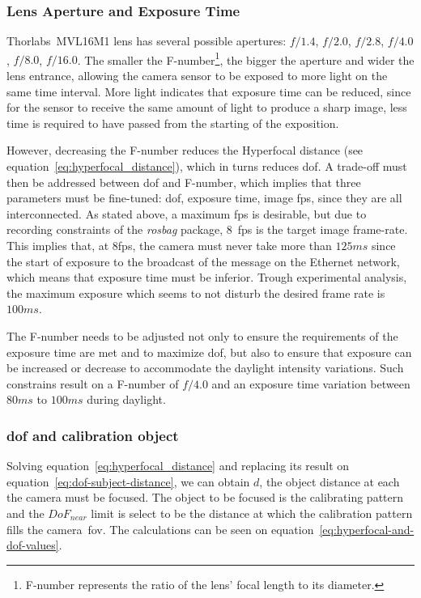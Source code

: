 \subsubsection{Lens Aperture and Exposure Time}
Thorlabs\cp~MVL16M1 lens has several possible apertures: $f/1.4$, $f/2.0$, $f/2.8$, $f/4.0$, $f/8.0$, $f/16.0$. The smaller the F-number\footnote{F-number represents the ratio of the lens' focal length to its diameter.}, the bigger the aperture and wider the lens entrance, allowing the camera sensor to be exposed to more light on the same time interval. More light indicates that exposure time can be reduced, since for the sensor to receive the same amount of light to produce a sharp image, less time is required to have passed from the starting of the exposition.

However, decreasing the F-number reduces the Hyperfocal distance (see equation~\ref{eq:hyperfocal_distance}), which in turns reduces \acf{dof}. A trade-off must then be addressed between \ac{dof} and F-number, which implies that three parameters must be fine-tuned: \ac{dof}, exposure time, image \ac{fps}, since they are all interconnected. As stated above, a maximum \ac{fps} is desirable, but due to recording constraints of the \emph{rosbag} package, $8$~\ac{fps} is the target image frame-rate. This implies that, at $8$\ac{fps}, the camera must never take more than $125ms$ since the start of exposure to the broadcast of the message on the Ethernet network, which means that exposure time must be inferior. Trough experimental analysis, the maximum exposure which seems to not disturb the desired frame rate is $100ms$. 

The F-number needs to be adjusted not only to ensure the requirements of the exposure time are met and to maximize \acl{dof}, but also to ensure that exposure can be increased or decrease to accommodate the daylight intensity variations. Such constrains result on a F-number of $f/4.0$ and an exposure time variation between $80ms$ to $100ms$ during daylight.

\subsubsection{\acl{dof} and calibration object}
\label{subsec:calibration:dof-and-calibration-object}
Solving equation~\ref{eq:hyperfocal_distance} and replacing its result on equation~\ref{eq:dof-subject-distance}, we can obtain $d$, the object distance at each the camera must be focused. The object to be focused is the calibrating pattern and the $DoF_{near}$ limit is select to be the distance at which the calibration pattern fills the camera~\ac{fov}. The calculations can be seen on equation~\ref{eq:hyperfocal-and-dof-values}.

